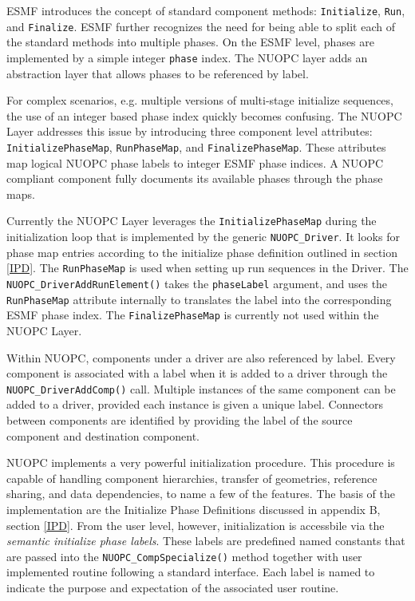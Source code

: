 %

\label{PhaseMaps}

ESMF introduces the concept of standard component methods: {\tt Initialize}, {\tt Run}, and {\tt Finalize}. ESMF further recognizes the need for being able to split each of the standard methods into multiple phases. On the ESMF level, phases are implemented by a simple integer {\tt phase} index. The NUOPC layer adds an abstraction layer that allows phases to be referenced by label.

For complex scenarios, e.g. multiple versions of multi-stage initialize sequences, the use of an integer based phase index quickly becomes confusing. The NUOPC Layer addresses this issue by introducing three component level attributes: {\tt InitializePhaseMap}, {\tt RunPhaseMap}, and {\tt FinalizePhaseMap}. These attributes map logical NUOPC phase labels to integer ESMF phase indices. A NUOPC compliant component fully documents its available phases through the phase maps.

Currently the NUOPC Layer leverages the {\tt InitializePhaseMap} during the initialization loop that is implemented by the generic {\tt NUOPC\_Driver}. It looks for phase map entries according to the initialize phase definition outlined in section \ref{IPD}. The {\tt RunPhaseMap} is used when setting up run sequences in the Driver. The {\tt NUOPC\_DriverAddRunElement()} takes the {\tt phaseLabel} argument, and uses the {\tt RunPhaseMap} attribute internally to translates the label into the corresponding ESMF phase index. The {\tt FinalizePhaseMap} is currently not used within the NUOPC Layer.

Within NUOPC, components under a driver are also referenced by label. Every component is associated with a label when it is added to a driver through the {\tt NUOPC\_DriverAddComp()} call. Multiple instances of the same component can be added to a driver, provided each instance is given a unique label. Connectors between components are identified by providing the label of the source component and destination component.

NUOPC implements a very powerful initialization procedure. This procedure is capable of handling component hierarchies, transfer of geometries, reference sharing, and data dependencies, to name a few of the features. The basis of the implementation are the Initialize Phase Definitions discussed in appendix B, section \ref{IPD}. From the user level, however, initialization is accessbile via the {\em semantic initialize phase labels}. These labels are predefined named constants that are passed into the {\tt NUOPC\_CompSpecialize()} method together with user implemented routine following a standard interface. Each label is named to indicate the purpose and expectation of the associated user routine.

